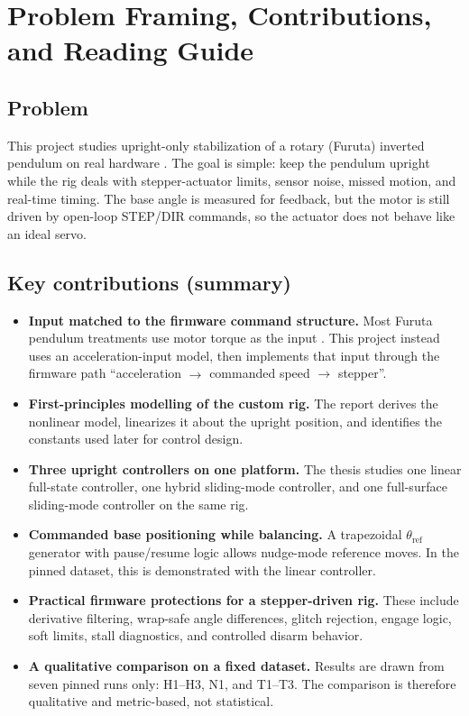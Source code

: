 \chapter{Problem Framing, Contributions, and Reading Guide}
\label{ch:framing}

\section{Problem}
This project studies upright-only stabilization of a rotary (Furuta) inverted pendulum on real hardware \cite{Furuta1991,Hamza2019,Ju2025}. The goal is simple: keep the pendulum upright while the rig deals with stepper-actuator limits, sensor noise, missed motion, and real-time timing. The base angle is measured for feedback, but the motor is still driven by open-loop STEP/DIR commands, so the actuator does not behave like an ideal servo.

\section{Key contributions (summary)}
\begin{itemize}
  \item \textbf{Input matched to the firmware command structure.} Most Furuta pendulum treatments use motor torque as the input \cite{Cazzolato2011,Hamza2019}. This project instead uses an acceleration-input model, then implements that input through the firmware path ``acceleration $\rightarrow$ commanded speed $\rightarrow$ stepper''.
  \item \textbf{First-principles modelling of the custom rig.} The report derives the nonlinear model, linearizes it about the upright position, and identifies the constants used later for control design.
  \item \textbf{Three upright controllers on one platform.} The thesis studies one linear full-state controller, one hybrid sliding-mode controller, and one full-surface sliding-mode controller on the same rig.
  \item \textbf{Commanded base positioning while balancing.} A trapezoidal $\theta_{\text{ref}}$ generator with pause/resume logic allows nudge-mode reference moves. In the pinned dataset, this is demonstrated with the linear controller.
  \item \textbf{Practical firmware protections for a stepper-driven rig.} These include derivative filtering, wrap-safe angle differences, glitch rejection, engage logic, soft limits, stall diagnostics, and controlled disarm behavior.
  \item \textbf{A qualitative comparison on a fixed dataset.} Results are drawn from seven pinned runs only: H1--H3, N1, and T1--T3. The comparison is therefore qualitative and metric-based, not statistical.
\end{itemize}

